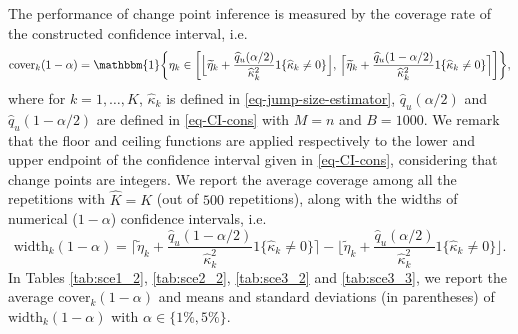 \documentclass[11pt]{article}
\theoremstyle{plain}
\theoremstyle{definition}
\newcommand{\zifeng}[1]{\textcolor{purple}{(Zifeng: #1)}}
\newcommand{\hx}[1]{\textcolor{orange}{(hx: #1)}}
\begin{document}
The performance of change point inference is measured by the coverage rate of the constructed confidence interval, i.e.
\begin{equation*}
    \mathrm{cover}_k(1-\alpha)  = \mathbbm{1}\bigg\{ \eta_k \in \bigg[\Big\lfloor\widetilde{\eta}_k + \frac{\widehat{q}_u(\alpha/2)}{\widehat{\kappa}_k^2} \mathrm{1}\{\widehat{\kappa}_k \neq 0\}\Big\rfloor, \, \Big\lceil\widetilde{\eta}_k + \frac{\widehat{q}_u(1-\alpha/2)}{\widehat{\kappa}_k^2}\mathrm{1}\{\widehat{\kappa}_k \neq 0\}\Big\rceil \bigg]\bigg\},
\end{equation*}
where for $k = 1, \dots, K$, $\widehat{\kappa}_k$ is defined in \eqref{eq-jump-size-estimator}, $\widehat{q}_u(\alpha/2)$ and $\widehat{q}_u(1-\alpha/2)$ are defined in \eqref{eq-CI-cons} with $M = n$ and $B = 1000$. We remark that the floor and ceiling functions are applied respectively to the lower and upper endpoint of the confidence interval given in \eqref{eq-CI-cons}, considering that change points are integers.  We report the average coverage among all the repetitions with $\widehat{K} = K$ (out of $500$ repetitions), along with the widths of numerical ($1-\alpha$) confidence intervals, i.e.
\begin{equation*}
    \mathrm{width}_k(1-\alpha)  = \Big\lceil\widetilde{\eta}_k + \frac{\widehat{q}_u(1-\alpha/2)}{\widehat{\kappa}_k^2} \mathrm{1}\{\widehat{\kappa}_k \neq 0\} \Big\rceil - \Big\lfloor \widetilde{\eta}_k +\frac{\widehat{q}_u(\alpha/2)}{\widehat{\kappa}_k^2} \mathrm{1}\{\widehat{\kappa}_k \neq 0\} \Big\rfloor.
\end{equation*}
In Tables \ref{tab:sce1_2}, \ref{tab:sce2_2}, \ref{tab:sce3_2} and \ref{tab:sce3_3}, we report the average $\mathrm{cover}_k(1-\alpha)$ and means and standard deviations (in parentheses) of $\mathrm{width}_k(1-\alpha)$ with $\alpha \in \{1\%, 5\%\}$. %
\end{document}

